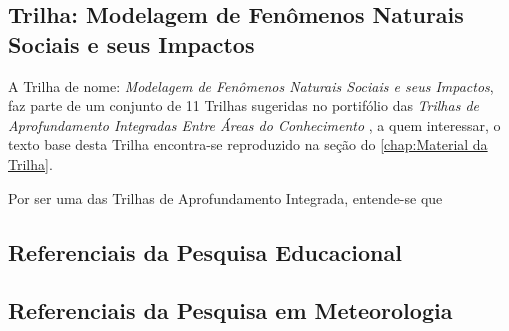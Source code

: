 \subsection{Trilha: Modelagem de Fenômenos Naturais Sociais e seus Impactos} %
\label{sub:Trilha: Modelagem de Fenômenos Naturais Sociais e seus Impactos}
A Trilha de nome: \textit{Modelagem de Fenômenos Naturais Sociais e seus Impactos}, faz parte de um conjunto de 11 Trilhas sugeridas no portifólio das \textit{Trilhas de Aprofundamento Integradas Entre Áreas do Conhecimento} \cite{CATARINA:2021c}, a quem interessar, o texto base desta Trilha encontra-se reproduzido na seção do \autoref{chap:Material da Trilha}.

Por ser uma das Trilhas de Aprofundamento Integrada, entende-se que 


\subsection{Referenciais da Pesquisa Educacional} %
\label{sub:Referenciais da Pesquisa Educacional}

\subsection{Referenciais da Pesquisa em Meteorologia} %
\label{sub:Referenciais da Pesquisa em Meteorologia}



